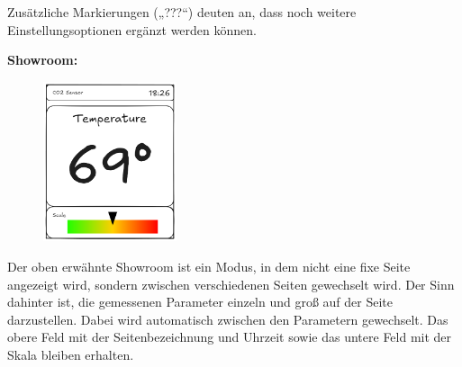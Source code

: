 \begin{inhalt}
Zusätzliche Markierungen („???“) deuten an, dass noch weitere Einstellungsoptionen ergänzt werden können.

\begin{center}
    \textbf{Showroom:}
\end{center}

\begin{figure}[!htb]
\centering
\includegraphics[width=0.35\textwidth]{files/Tobias/pics/Skizzen/Showroom1.png}
\caption[Display Interface Skizze (Showroom)]{}
\label{fig:display_skizze_showroom1}
\end{figure}

Der oben erwähnte Showroom ist ein Modus, in dem nicht eine fixe Seite angezeigt wird, sondern zwischen verschiedenen Seiten gewechselt wird. Der Sinn dahinter ist, die gemessenen Parameter einzeln und groß auf der Seite darzustellen. Dabei wird automatisch zwischen den Parametern gewechselt. Das obere Feld mit der Seitenbezeichnung und Uhrzeit sowie das untere Feld mit der Skala bleiben erhalten.

\end{inhalt}